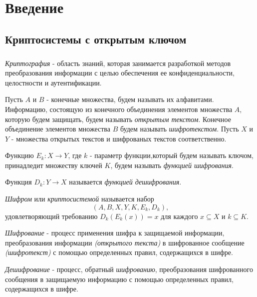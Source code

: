 
\newpage
\chapter*{Введение}

\section*{Криптосистемы с открытым ключом}
\paragraph{} \textit{Криптография} - область знаний, которая занимается разработкой методов преобразования информации с целью обеспечения ее 
конфиденциальности, целостности и аутентификации.

  Пусть $A$ и $B$  - конечные множества, будем называть их алфавитами. Информацию, состоящую из конечного объединения элементов 
множества $A$, которую будем защищать, будем называть \textit{открытым текстом}. Конечное объединение элементов множества $B$ будем 
называть \textit{шифротекстом}. Пусть $X$ и $Y$ - множества открытых текстов и шифрованых текстов соответственно.

  Функцию $E_{k} : X \rightarrow Y$, где $k$ - параметр функции,который будем называть ключом, 
принадледит множеству ключей $K$, будем называть \textit{функцией шифрования}. 

  Функция $D_{k} : Y \rightarrow X$ называется \textit{функцией дешифрования}.

  \textit{Шифром} или \textit{криптосистемой} называется набор 
  \begin{equation}
    (A, B, X, Y, K, E_{k}, D_{k}),
  \end{equation}
  удовлетворяющий требованию $D_{k}(E_{k}(x)) = x$ для каждого $x \subseteq X$ и $k \subseteq K$.

  \textit{Шифрование} - процесс применения шифра к защищаемой информации, преобразования информации \textit{(открытого текста)} в шифрованное сообщение \textit{(шифротекст)} с помощью определенных правил, содержащихся в шифре.

  \textit{Дешифрование} - процесс, обратный \textit{шифрованию}, преобразования шифрованного сообщения в защищаемую информацию с помощью определенных 
правил, содержащихся в шифре.

